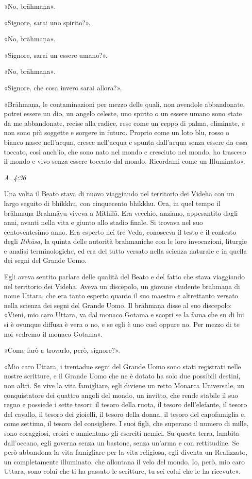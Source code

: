 «No, brāhmaṇa».


«Signore, sarai uno spirito?».


«No, brāhmaṇa».


«Signore, sarai un essere umano?».


«No, brāhmaṇa».


«Signore, che cosa invero sarai allora?».


«Brāhmaṇa, le contaminazioni per mezzo delle quali, non avendole
abbandonate, potrei essere un dio, un angelo celeste, uno spirito o un
essere umano sono state da me abbandonate, recise alla radice, rese come
un ceppo di palma, eliminate, e non sono più soggette e sorgere in
futuro. Proprio come un loto blu, rosso o bianco nasce nell’acqua,
cresce nell’acqua e spunta dall’acqua senza essere da essa toccato, così
anch’io, che sono nato nel mondo e cresciuto nel mondo, ho trasceso il
mondo e vivo senza essere toccato dal mondo. Ricordami come un
Illuminato».


\emph{A. 4:36}


Una volta il Beato stava di nuovo viaggiando nel territorio dei Videha
con un largo seguito di bhikkhu, con cinquecento bhikkhu. Ora, in quel
tempo il brāhmaṇa Brahmāyu viveva a Mithilā. Era vecchio, anziano,
appesantito dagli anni, avanti nella vita e giunto allo stadio finale.
Si trovava nel suo centoventesimo anno. Era esperto nei tre Veda,
conosceva il testo e il contesto degli \emph{Itihāsa}, la quinta delle
autorità brahmaniche con le loro invocazioni, liturgie e analisi
terminologiche, ed era del tutto versato nella scienza naturale e in
quella dei segni del Grande Uomo.


Egli aveva sentito parlare delle qualità del Beato e del fatto che stava
viaggiando nel territorio dei Videha. Aveva un discepolo, un giovane
studente brāhmaṇa di nome Uttara, che era tanto esperto quanto il suo
maestro e altrettanto versato nella scienza dei segni del Grande Uomo.
Il brāhmaṇa disse al suo discepolo: «Vieni, mio caro Uttara, va dal
monaco Gotama e scopri se la fama che su di lui si è ovunque diffusa è
vera o no, e se egli è uno così oppure no. Per mezzo di te noi vedremo
il monaco Gotama».


«Come farò a trovarlo, però, signore?».


«Mio caro Uttara, i trentadue segni del Grande Uomo sono stati
registrati nelle nostre scritture, e il Grande Uomo che ne è dotato ha
solo due possibili destini, non altri. Se vive la vita famigliare, egli
diviene un retto Monarca Universale, un conquistatore dei quattro angoli
del mondo, un invitto, che rende stabile il suo regno e possiede i sette
tesori: il tesoro della ruota, il tesoro dell’elefante, il tesoro del
cavallo, il tesoro dei gioielli, il tesoro della donna, il tesoro del
capofamiglia e, come settimo, il tesoro del consigliere. I suoi figli,
che superano il numero di mille, sono coraggiosi, eroici e annientano
gli eserciti nemici. Su questa terra, lambita dall’oceano, egli governa
senza un bastone, senza un’arma e con rettitudine. Se però abbandona la
vita famigliare per la vita religiosa, egli diventa un Realizzato, un
completamente illuminato, che allontana il velo del mondo. Io, però, mio
caro Uttara, sono colui che ti ha passato le scritture, tu sei colui che
le ha ricevute».


